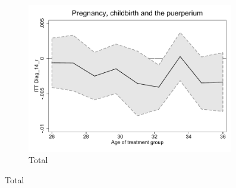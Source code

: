 \documentclass[a4paper ]{article}
\begin{document}
\begin{figure}[h!]
	\centering
	\begin{subfigure}[t]{0.5\textwidth}
		\centering
		\includegraphics[width=0.99\textwidth]{R1_LC_Diag_14_r}
		\caption{Total}		
	\end{subfigure}
\end{figure}
\newpage
\end{document}

